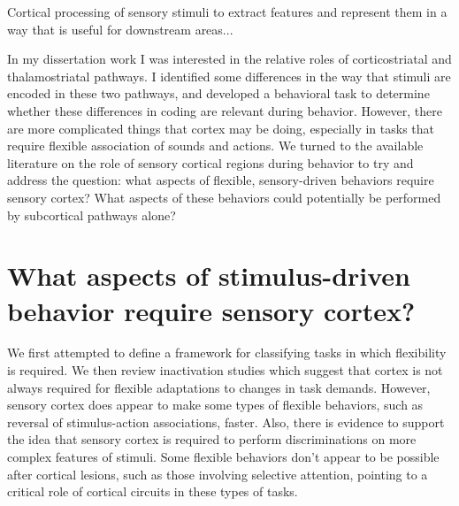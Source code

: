 
Cortical processing of sensory stimuli to extract features and represent them in a way that is useful for downstream areas...

In my dissertation work I was interested in the relative roles of corticostriatal and thalamostriatal pathways. 
%
I identified some differences in the way that stimuli are encoded in these two pathways, and developed a behavioral task to determine whether these differences in coding are relevant during behavior.
%
However, there are more complicated things that cortex may be doing, especially in tasks that require flexible association of sounds and actions. 
%
We turned to the available literature on the role of sensory cortical regions during behavior to try and address the question: what aspects of flexible, sensory-driven behaviors require sensory cortex? 
%
What aspects of these behaviors could potentially be performed by subcortical pathways alone?

\section{What aspects of stimulus-driven behavior require sensory cortex?}

We first attempted to define a framework for classifying tasks in which flexibility is required. 
%
We then review inactivation studies which suggest that cortex is not always required for flexible adaptations to changes in task demands. 
%
However, sensory cortex does appear to make some types of flexible behaviors, such as reversal of stimulus-action associations, faster. 
%
Also, there is evidence to support the idea that sensory cortex is required to perform discriminations on more complex features of stimuli. 
%
Some flexible behaviors don't appear to be possible after cortical lesions, such as those involving selective attention, pointing to a critical role of cortical circuits in these types of tasks. 


